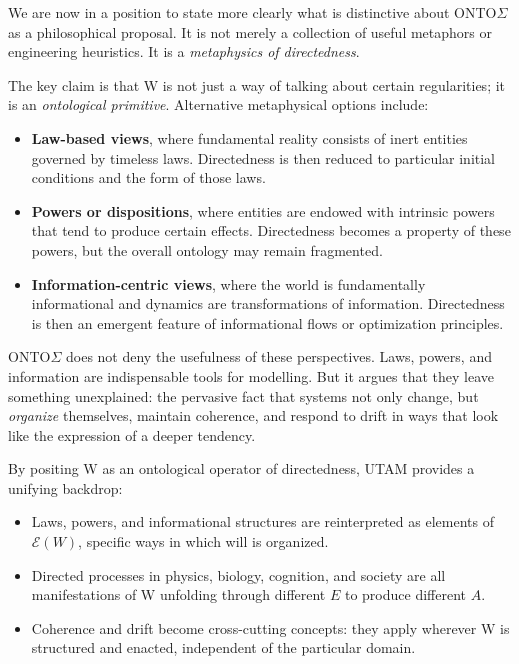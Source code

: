 \documentclass[12pt,a4paper]{report}
\newcommand{\Will}{W}
\newcommand{\Struct}{E}
\newcommand{\Act}{A}
\begin{document}
We are now in a position to state more clearly what is distinctive about ONTO$\Sigma$ as a philosophical proposal. It is not merely a collection of useful metaphors or engineering heuristics. It is a \emph{metaphysics of directedness}.

The key claim is that \Will{} is not just a way of talking about certain regularities; it is an \emph{ontological primitive}. Alternative metaphysical options include:

\begin{itemize}[leftmargin=2em]
    \item \textbf{Law-based views}, where fundamental reality consists of inert entities governed by timeless laws. Directedness is then reduced to particular initial conditions and the form of those laws.
    \item \textbf{Powers or dispositions}, where entities are endowed with intrinsic powers that tend to produce certain effects. Directedness becomes a property of these powers, but the overall ontology may remain fragmented.
    \item \textbf{Information-centric views}, where the world is fundamentally informational and dynamics are transformations of information. Directedness is then an emergent feature of informational flows or optimization principles.
\end{itemize}

ONTO$\Sigma$ does not deny the usefulness of these perspectives. Laws, powers, and information are indispensable tools for modelling. But it argues that they leave something unexplained: the pervasive fact that systems not only change, but \emph{organize} themselves, maintain coherence, and respond to drift in ways that look like the expression of a deeper tendency.

By positing \Will{} as an ontological operator of directedness, UTAM provides a unifying backdrop:

\begin{itemize}[leftmargin=2em]
    \item Laws, powers, and informational structures are reinterpreted as elements of \(\mathcal{E}(\Will)\), specific ways in which will is organized.
    \item Directed processes in physics, biology, cognition, and society are all manifestations of \Will{} unfolding through different \(\Struct\) to produce different \(\Act\).
    \item Coherence and drift become cross-cutting concepts: they apply wherever \Will{} is structured and enacted, independent of the particular domain.
\end{itemize}
\end{document}
